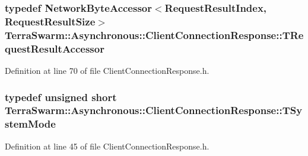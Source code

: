 \hypertarget{class_terra_swarm_1_1_asynchronous_1_1_client_connection_response_a43af70d1b67752224dd262c6fdd31a7e}{
\subsubsection[{T\-Request\-Result\-Accessor}]{\setlength{\rightskip}{0pt plus 5cm}typedef {\bf Network\-Byte\-Accessor}$<${\bf Request\-Result\-Index}, {\bf Request\-Result\-Size}$>$ {\bf Terra\-Swarm\-::\-Asynchronous\-::\-Client\-Connection\-Response\-::\-T\-Request\-Result\-Accessor}\hspace{0.3cm}{\ttfamily [private]}}}\label{class_terra_swarm_1_1_asynchronous_1_1_client_connection_response_a43af70d1b67752224dd262c6fdd31a7e}


Definition at line 70 of file Client\-Connection\-Response.\-h.

\hypertarget{class_terra_swarm_1_1_asynchronous_1_1_client_connection_response_ac34facba96c97e6897a1abd5ddd09159}{
\subsubsection[{T\-System\-Mode}]{\setlength{\rightskip}{0pt plus 5cm}typedef unsigned short {\bf Terra\-Swarm\-::\-Asynchronous\-::\-Client\-Connection\-Response\-::\-T\-System\-Mode}}}\label{class_terra_swarm_1_1_asynchronous_1_1_client_connection_response_ac34facba96c97e6897a1abd5ddd09159}


Definition at line 45 of file Client\-Connection\-Response.\-h.

